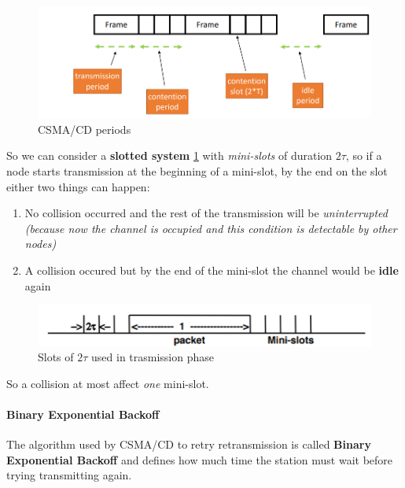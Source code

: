 \documentclass[10pt,a4paper]{report}
\theoremstyle{definition}
\begin{document}
\begin{figure}[h]
	\centering\includegraphics[scale=0.50]{images/Pasted image 20230225094641.png}
	\caption{CSMA/CD periods}
\end{figure}

So we can consider a \textbf{slotted system} \ref{slotted-system} with \textit{mini-slots} of duration $2\tau$, so if a node starts transmission at the beginning of a mini-slot, by the end on the slot either two things can happen:
\begin{enumerate}
	\item 
	No collision occurred and the rest of the transmission will be \textit{uninterrupted (because now the channel is occupied and this condition is detectable by other nodes)}
	\item 
	A collision occured but by the end of the mini-slot the channel would be \textbf{idle} again

	

\end{enumerate}

\begin{figure}[h]
	\centering
	\includegraphics[scale=0.50]{images/Pasted image 20230225094934.png}
	\caption{Slots of $2\tau$ used in trasmission phase}
	\label{slotted-system}
\end{figure}
	So a collision at most affect \textit{one} mini-slot.
	
	
\paragraph{Binary Exponential Backoff}\label{sec:binary-exponential-backoff}
The algorithm used by CSMA/CD to retry retransmission is called \textbf{Binary Exponential Backoff} and defines how much time the station must wait before trying transmitting again.
\end{document}
